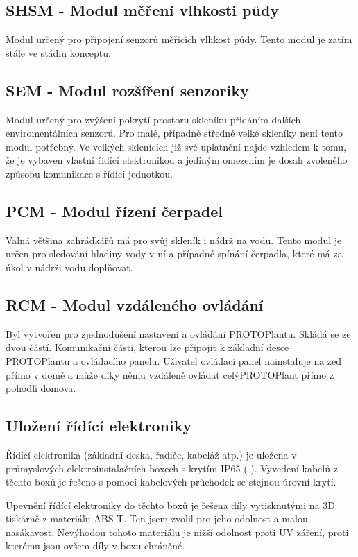 \subsection{SHSM - Modul měření vlhkosti půdy}
\label{subsec:SHSM}
Modul určený pro připojení senzorů měřících vlhkost půdy.
Tento modul je zatím stále ve stádiu konceptu.

\subsection{SEM - Modul rozšíření senzoriky}
\label{subsec:SEM}
Modul určený pro zvýšení pokrytí prostoru skleníku přidáním dalších enviromentálních senzorů.
Pro malé, případně středně velké skleníky není tento modul potřebný. 
Ve velkých sklenících již své uplatnění najde vzhledem k tomu, že je vybaven vlastní řídící elektronikou a jediným omezením je dosah zvoleného způsobu komunikace s řídící jednotkou.

\subsection{PCM - Modul řízení čerpadel}
\label{subsec:PCM}
Valná většina zahrádkářů má pro svůj skleník i nádrž na vodu.
Tento modul je určen pro sledování hladiny vody v ní a případné spínání čerpadla, které má za úkol v nádrži vodu doplňovat.

\subsection{RCM - Modul vzdáleného ovládání}
\label{subsec:RCM}
Byl vytvořen pro zjednodušení nastavení a ovládání PROTOPlantu.
Skládá se ze dvou částí. 
Komunikační části, kterou lze připojit k základní desce PROTOPlantu a ovládacího panelu. 
Uživatel ovládací panel nainstaluje na zeď přímo v domě a může díky němu vzdáleně ovládat celýPROTOPlant přímo z pohodlí domova. 

\subsection{Uložení řídící elektroniky}
Řídící elektronika (základní deska, řadiče, kabeláž atp.) je uložena v průmyslových elektroinstalačních boxech s krytím IP65 ( \cite{IP_ratings}).
Vyvedení kabelů z těchto boxů je řešeno s pomocí kabelových průchodek se stejnou úrovní krytí.

Upevnění řídící elektroniky do těchto boxů je řešena díly vytisknutými na 3D tiskárně z materiálu ABS-T.
Ten jsem zvolil pro jeho odolnost a malou nasákavost.
Nevýhodou tohoto materiálu je nižší odolnost proti UV záření, proti kterému jsou ovšem díly v boxu chráněné.


